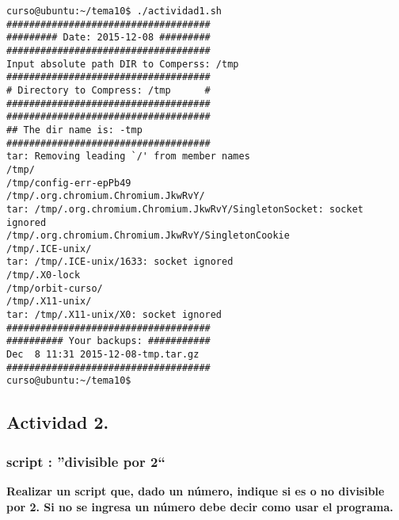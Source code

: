 \documentclass[a4paper,11pt,spanish]{article} %
\newenvironment{myscriptlisting}
{\begin{list}{}{\setlength{\leftmargin}{1em}}\item\scriptsize\bfseries}
{\end{list}}
\begin{document}
\begin{myscriptlisting}
 \begin{verbatim}
curso@ubuntu:~/tema10$ ./actividad1.sh 
####################################
######### Date: 2015-12-08 #########
####################################
Input absolute path DIR to Comperss: /tmp
####################################
# Directory to Compress: /tmp      #
####################################
####################################
## The dir name is: -tmp       
####################################
tar: Removing leading `/' from member names
/tmp/
/tmp/config-err-epPb49
/tmp/.org.chromium.Chromium.JkwRvY/
tar: /tmp/.org.chromium.Chromium.JkwRvY/SingletonSocket: socket ignored
/tmp/.org.chromium.Chromium.JkwRvY/SingletonCookie
/tmp/.ICE-unix/
tar: /tmp/.ICE-unix/1633: socket ignored
/tmp/.X0-lock
/tmp/orbit-curso/
/tmp/.X11-unix/
tar: /tmp/.X11-unix/X0: socket ignored
####################################
########## Your backups: ###########
Dec  8 11:31 2015-12-08-tmp.tar.gz                         
####################################
curso@ubuntu:~/tema10$ 
 \end{verbatim}
\end{myscriptlisting}


\subsection{Actividad 2.}

\subsubsection{script : ''divisible por 2``}

\textbf{Realizar un script que, dado un número, indique si es o no divisible por 2. 
Si no se ingresa un número debe decir como usar el programa.}\\
\end{document}
